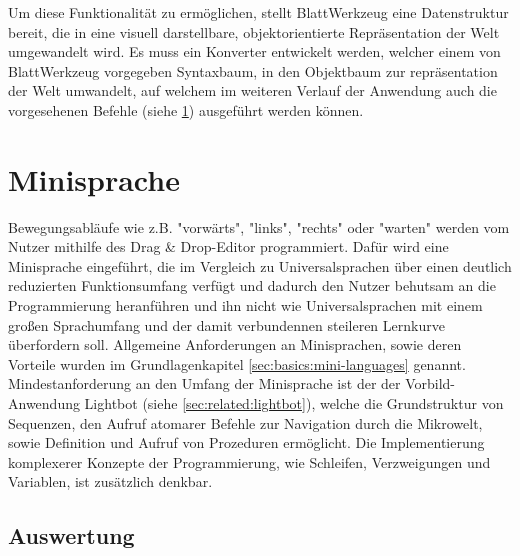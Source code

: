 
Um diese Funktionalität zu ermöglichen, stellt BlattWerkzeug eine Datenstruktur bereit, die in eine visuell darstellbare, objektorientierte Repräsentation der Welt umgewandelt wird. Es muss ein Konverter entwickelt werden, welcher einem von BlattWerkzeug vorgegeben Syntaxbaum, in den Objektbaum zur repräsentation der Welt umwandelt, auf welchem im weiteren Verlauf der Anwendung auch die vorgesehenen Befehle (siehe \ref{sec:requirements:program}) ausgeführt werden können.

\section{Minisprache}
\label{sec:requirements:program}

Bewegungsabläufe wie z.B. "vorwärts", "links", "rechts" oder "warten" werden vom Nutzer mithilfe des Drag \& Drop-Editor programmiert. Dafür wird eine Minisprache eingeführt, die im Vergleich zu Universalsprachen über einen deutlich reduzierten Funktionsumfang verfügt und dadurch den Nutzer behutsam an die Programmierung heranführen und ihn nicht wie Universalsprachen mit einem großen Sprachumfang und der damit verbundennen steileren Lernkurve überfordern soll. Allgemeine Anforderungen an Minisprachen, sowie deren Vorteile wurden im Grundlagenkapitel \ref{sec:basics:mini-languages} genannt. Mindestanforderung an den Umfang der Minisprache ist der der Vorbild-Anwendung Lightbot (siehe \ref{sec:related:lightbot}), welche die Grundstruktur von Sequenzen, den Aufruf atomarer Befehle zur Navigation durch die Mikrowelt, sowie Definition und Aufruf von Prozeduren ermöglicht. Die Implementierung komplexerer Konzepte der Programmierung, wie Schleifen, Verzweigungen und Variablen, ist zusätzlich denkbar.

\subsection{Auswertung}
\label{sec:requirements:world:compile-interpret}

